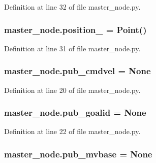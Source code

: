 Definition at line 32 of file master\+\_\+node.\+py.

\subsubsection[{\texorpdfstring{position\+\_\+}{position_}}]{\setlength{\rightskip}{0pt plus 5cm}master\+\_\+node.\+position\+\_\+ = Point()}\hypertarget{namespacemaster__node_a2b8dbb239eb4afff7f8a9c3b753453b7}{}\label{namespacemaster__node_a2b8dbb239eb4afff7f8a9c3b753453b7}


Definition at line 31 of file master\+\_\+node.\+py.

\subsubsection[{\texorpdfstring{pub\+\_\+cmdvel}{pub_cmdvel}}]{\setlength{\rightskip}{0pt plus 5cm}master\+\_\+node.\+pub\+\_\+cmdvel = None}\hypertarget{namespacemaster__node_af03f741dfc4d9a61fc42d34ab839fe6e}{}\label{namespacemaster__node_af03f741dfc4d9a61fc42d34ab839fe6e}


Definition at line 20 of file master\+\_\+node.\+py.

\subsubsection[{\texorpdfstring{pub\+\_\+goalid}{pub_goalid}}]{\setlength{\rightskip}{0pt plus 5cm}master\+\_\+node.\+pub\+\_\+goalid = None}\hypertarget{namespacemaster__node_ad7127d88e820a8bf947a841356004bf6}{}\label{namespacemaster__node_ad7127d88e820a8bf947a841356004bf6}


Definition at line 22 of file master\+\_\+node.\+py.

\subsubsection[{\texorpdfstring{pub\+\_\+mvbase}{pub_mvbase}}]{\setlength{\rightskip}{0pt plus 5cm}master\+\_\+node.\+pub\+\_\+mvbase = None}\hypertarget{namespacemaster__node_a9a27ed10dbb3608f8a22d7d2d8aa1efa}{}\label{namespacemaster__node_a9a27ed10dbb3608f8a22d7d2d8aa1efa}



